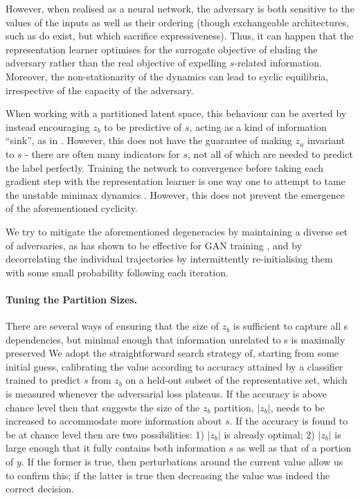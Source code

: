 However, when realised as a neural network, the adversary is both sensitive to the values of the
inputs as well as their ordering (though exchangeable architectures, such as \citet{zaheer2017deep}
do exist, but which sacrifice expressiveness). 
%
Thus, it can happen that the representation learner optimises for the surrogate objective of
eluding the adversary rather than the real objective of expelling $s$-related information. 
%
Moreover, the non-stationarity of the dynamics can lead to cyclic equilibria, irrespective of the
capacity of the adversary.

When working with a partitioned latent space, this behaviour can be averted by instead encouraging
$z_b$ to be predictive of $s$, acting as a kind of information ``sink'', as in \citet{JacSmeOya18}.
%
However, this does not have the guarantee of making $z_u$ invariant to $s$ - there are often many
indicators for $s$, not all of which are needed to predict the label perfectly. 
%
Training the network to convergence before taking each gradient step with the representation
learner is one way one to attempt to tame the unstable minimax dynamics \citep{feng2019learning}. 
%
However, this does not prevent the emergence of the aforementioned cyclicity.

We try to mitigate the aforementioned degeneracies by maintaining a diverse set of adversaries, as
has shown to be effective for GAN training \citep{durugkar2016generative}, and by decorrelating the
individual trajectories by intermittently re-initialising them with some small probability
following each iteration.

\paragraph{Tuning the Partition Sizes.}
%
There are several ways of ensuring that the size of $z_b$ is sufficient to capture all s
dependencies, but minimal enough that information unrelated to s is maximally preserved We adopt
the straightforward search strategy of, starting from some initial guess, calibrating the value
according to accuracy attained by a classifier trained to predict $s$ from $z_b$ on a held-out
subset of the representative set, which is measured whenever the adversarial loss plateaus. 
%
If the accuracy is above chance level then that suggests the size of the $z_b$ partition, $|z_b|$,
needs to be increased to accommodate more information about $s$. 
%
If the accuracy is found to be at chance level then are two possibilities: 
%
1) $|z_b|$ is already optimal; 
%
2) $|z_b|$ is large enough that it fully contains both information $s$ as well as that of a portion
of $y$. 
%
If the former is true, then perturbations around the current value allow us to confirm this; if the
latter is true then decreasing the value was indeed the correct decision.

